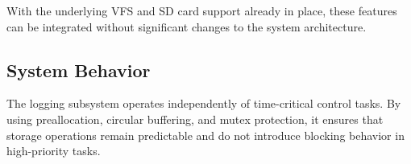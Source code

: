 With the underlying VFS and SD card support already in place, these features can be integrated without significant changes to the system architecture.

\subsection{System Behavior}

The logging subsystem operates independently of time-critical control tasks. By using preallocation, circular buffering, and mutex protection, it ensures that storage operations remain predictable and do not introduce blocking behavior in high-priority tasks.
